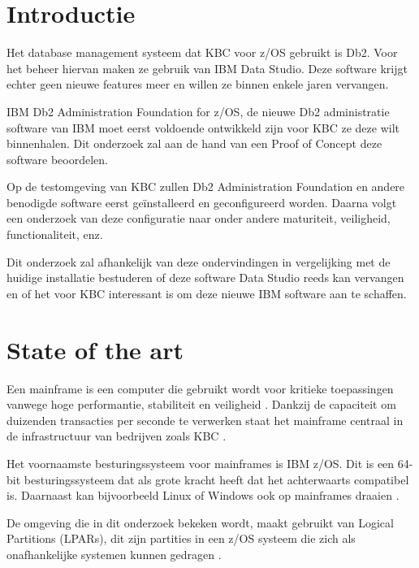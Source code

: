 
\section{Introductie}%
\label{sec:introductie}

Het database management systeem dat KBC voor z/OS gebruikt is Db2. Voor het beheer hiervan maken ze gebruik van IBM Data Studio. Deze software krijgt echter geen nieuwe features meer en willen ze binnen enkele jaren vervangen.

IBM Db2 Administration Foundation for z/OS, de nieuwe Db2 administratie software van IBM moet eerst voldoende ontwikkeld zijn voor KBC ze deze wilt binnenhalen. Dit onderzoek zal aan de hand van een Proof of Concept deze software beoordelen.

Op de testomgeving van KBC zullen Db2 Administration Foundation en andere benodigde software eerst geïnstalleerd en geconfigureerd worden. Daarna volgt een onderzoek van deze configuratie naar onder andere maturiteit, veiligheid, functionaliteit, enz. 

Dit onderzoek zal afhankelijk van deze ondervindingen in vergelijking met de huidige installatie bestuderen of deze software Data Studio reeds kan vervangen en of het voor KBC interessant is om deze nieuwe IBM software aan te schaffen.



\section{State of the art}%
\label{sec:state-of-the-art}

Een mainframe is een computer die gebruikt wordt voor kritieke toepassingen vanwege hoge performantie, stabiliteit en veiligheid \autocite{IBM}. Dankzij de capaciteit om duizenden transacties per seconde te verwerken staat het mainframe centraal in de infrastructuur van bedrijven zoals KBC \autocite{IBM2010}.

Het voornaamste besturingssysteem voor mainframes is IBM z/OS. Dit is een 64-bit besturingssysteem dat als grote kracht heeft dat het achterwaarts compatibel is. Daarnaast kan bijvoorbeeld Linux of Windows ook op mainframes draaien \autocite{MaryE.Shacklett2022}.

De omgeving die in dit onderzoek bekeken wordt, maakt gebruikt van Logical Partitions (LPARs), dit zijn partities in een z/OS systeem die zich als onafhankelijke systemen kunnen gedragen \autocite{IBM2010a}.

